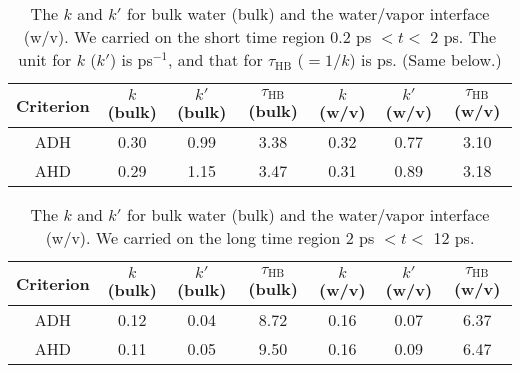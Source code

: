 \begin{table}[htb]
\centering
\caption{\label{tab:k_k_prime_128w_pure_1} 
    The $k$ and $k'$ for bulk water (bulk) and the water/vapor interface (w/v). We carried on the short time region 0.2 ps $< t <$ 2 ps. 
    The unit for $k$ ($k'$) is ps$^{-1}$, and that for $\tau_{\text{HB}}$ ($=1/k$) is ps. (Same below.)
} 
\begin{tabular}{ccccccc}
 Criterion & $k$  (bulk) & $k'$ (bulk) & $\tau_{\text{HB}}$ (bulk) & $k$  (w/v) & $k'$ (w/v) & $\tau_{\text{HB}}$ (w/v)\\
\hline
  ADH & 0.30  & 0.99 & 3.38  & 0.32 & 0.77 & 3.10 \\
  AHD & 0.29 & 1.15 & 3.47 & 0.31 & 0.89 & 3.18 \\
\end{tabular}
\end{table}
%
\begin{table}[htb]
\centering
\caption{\label{tab:k_k_prime_128w_pure_2} 
    The $k$ and $k'$ for bulk water (bulk) and the water/vapor interface (w/v). We carried on the long time region 2 ps $< t <$ 12 ps.
} 
\begin{tabular}{ccccccc}
 Criterion & $k$  (bulk) & $k'$ (bulk) & $\tau_{\text{HB}}$ (bulk) & $k$  (w/v) & $k'$ (w/v) & $\tau_{\text{HB}}$ (w/v)\\
\hline
  ADH & 0.12  & 0.04 & 8.72 & 0.16  & 0.07 & 6.37\\
  AHD & 0.11  & 0.05 & 9.50 & 0.16  & 0.09 & 6.47 \\
\end{tabular}
\end{table}
% 

